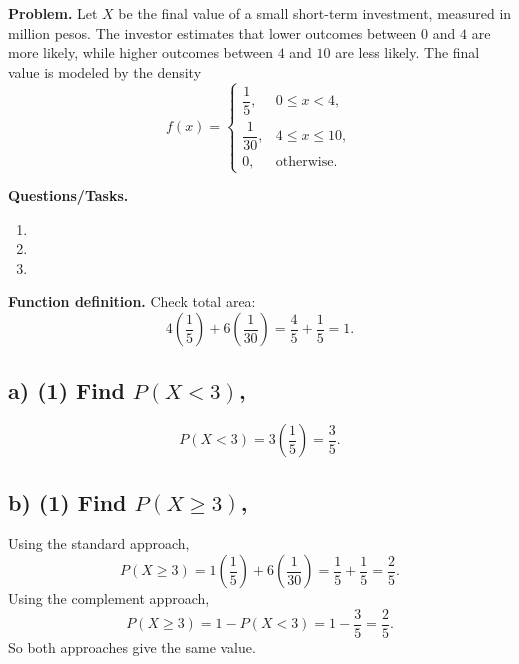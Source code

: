 \textbf{Problem.}
Let $X$ be the final value of a small short-term investment, measured in million pesos. The investor estimates that lower outcomes between $0$ and $4$ are more likely, while higher outcomes between $4$ and $10$ are less likely. The final value is modeled by the density
\[
f(x)=
\begin{cases}
	\dfrac{1}{5}, & 0\le x<4,\\
	\dfrac{1}{30}, & 4\le x\le 10,\\
	0, & \text{otherwise.}
\end{cases}
\]

\textbf{Questions/Tasks.}
\begin{enumerate}[label=\textbf{\alph*)}]
	\item {}
	\item {}
	\item {}
\end{enumerate}

\textbf{Function definition.}
Check total area:
\[
4\left(\frac{1}{5}\right)+6\left(\frac{1}{30}\right)=\frac{4}{5}+\frac{1}{5}=1.
\]



\subsection*{a) \textbf{(1)} Find $P(X < 3)$,}
\label{subsec:two-interval-piecewise-uniform-c2-a}
\[
P(X<3)=3\left(\frac{1}{5}\right)=\frac{3}{5}.
\]



\subsection*{b) \textbf{(1)} Find $P(X \ge 3)$,}
\label{subsec:two-interval-piecewise-uniform-c2-b}
Using the standard approach,
\[
P(X\ge 3)=1\left(\frac{1}{5}\right)+6\left(\frac{1}{30}\right)=\frac{1}{5}+\frac{1}{5}=\frac{2}{5}.
\]
Using the complement approach,
\[
P(X\ge 3)=1-P(X<3)=1-\frac{3}{5}=\frac{2}{5}.
\]
So both approaches give the same value.

